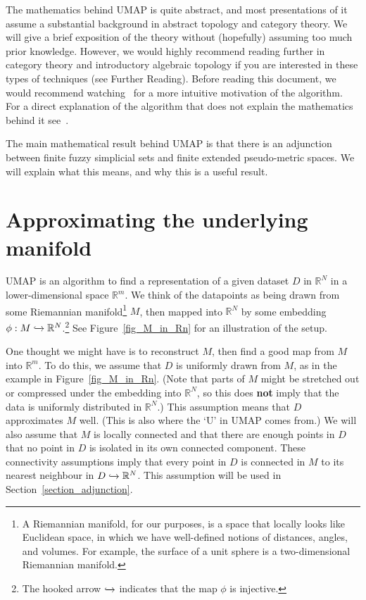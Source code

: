 \documentclass[a4paper,11pt,leqno]{article} \usepackage{amsmath}
\newcommand{\RR}{\mathbb{R}} \newcommand{\QQ}{\mathbb{Q}}
\theoremstyle{definition} \newtheorem{defn}{Definition}
\begin{document}
The mathematics behind UMAP is quite abstract, and most presentations of it
assume a substantial background in abstract topology and category theory.  We
will give a brief exposition of the theory without (hopefully) assuming too much
prior knowledge.  However, we would highly recommend reading further in category
theory and introductory algebraic topology if you are interested in these types
of techniques (see Further Reading).  Before reading this document, we would
recommend watching~\cite{McInnesVideo} for a more intuitive motivation of the
algorithm.  For a direct explanation of the algorithm that does not explain the
mathematics behind it see~\cite[Section 3]{McInnes18}.

The main mathematical result behind UMAP is that there is an adjunction between
finite fuzzy simplicial sets and finite extended pseudo-metric spaces.
We will explain what this means, and why this is a useful result.

\section{Approximating the underlying manifold} \label{section_uniform}

UMAP is an algorithm to find a representation of a given dataset $D$ in $\RR^N$
in a lower-dimensional space $\RR^m$.  We think of the datapoints as being drawn
from some Riemannian manifold\footnote{ A Riemannian manifold, for our purposes,
is a space that locally looks like Euclidean space, in which we have
well-defined notions of distances, angles, and volumes. For example, the surface
of a unit sphere is a two-dimensional Riemannian manifold.  } $M$, then mapped
into $\RR^N$ by some embedding $\phi: M\inj \RR^N$.\footnote{ The hooked arrow
$\xhookrightarrow{}$ indicates that the map $\phi$ is injective.  } See
Figure~\ref{fig_M_in_Rn} for an illustration of the setup.

One thought we might have is to reconstruct $M$, then find a good map from $M$
into $\RR^m$.  To do this, we assume that $D$ is uniformly drawn from $M$, as in
the example in Figure~\ref{fig_M_in_Rn}. (Note that parts of $M$ might be
stretched out or compressed under the embedding into $\RR^N$, so this does
{\textbf{not}} imply that the data is uniformly distributed in $\RR^N$.) This
assumption means that $D$ approximates $M$ well.  (This is also where the `U' in
UMAP comes from.) We will also assume that $M$ is locally connected and that
there are enough points in $D$ that no point in $D$ is isolated in its own
connected component.  These connectivity assumptions imply that every point in
$D$ is connected in $M$ to its nearest neighbour in $D\inj \RR^N$.  This
assumption will be used in Section~\ref{section_adjunction}.
\end{document}
